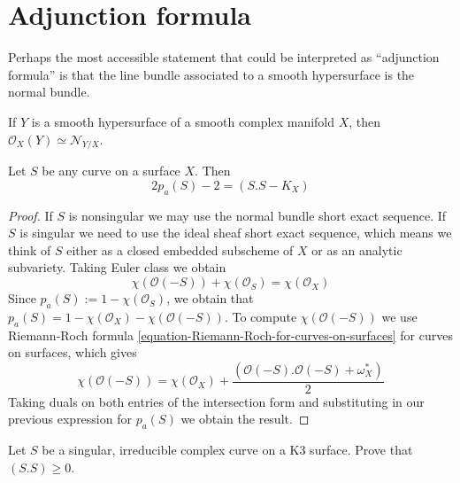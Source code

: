 \section{Adjunction formula}
\label{section-adjunction-formula}

Perhaps the most accessible statement that could be interpreted as ``adjunction
formula'' is that the line bundle associated to a smooth hypersurface is the
normal bundle.

\begin{theorem}
\label{theorem-adjunction-formula-1}
\begin{reference}
\cite[p.146]{gri}
\end{reference}
If $Y$ is a smooth hypersurface of a smooth complex manifold $X$, then
$\mathcal{O}_X(Y) \simeq \mathcal{N}_{Y/X}$.
\end{theorem}

\begin{lemma}
\label{lemma-adjunction-formula-for-curves-on-surfaces}
Let $S$ be any curve on a surface $X$. Then
\begin{equation}
\label{equation-adjunction-formula-for-curves-on-surfaces}
2p_a(S)-2=(S.S-K_X)
\end{equation}
\end{lemma}

\begin{proof}
If $S$ is nonsingular we may use the normal bundle short exact sequence. If
$S$ is singular we need to use the ideal sheaf short exact sequence, which means
we think of $S$ either as a closed embedded subscheme of $X$ or as an analytic 
subvariety. Taking Euler class we obtain
$$
\chi(\mathcal{O}(-S))+\chi(\mathcal{O}_S)=\chi(\mathcal{O}_X)
$$
Since $p_a(S):=1-\chi(\mathcal{O}_S)$, we obtain that
$p_a(S)=1-\chi(\mathcal{O}_X)-\chi(\mathcal{O}(-S))$. To compute
$\chi(\mathcal{O}(-S))$ we use Riemann-Roch formula
\ref{equation-Riemann-Roch-for-curves-on-surfaces} for curves on surfaces, which
gives
$$
\chi(\mathcal{O}(-S))=\chi(\mathcal{O}_X)
+\frac{(\mathcal{O}(-S).\mathcal{O}(-S)+\omega_X^*)}{2}
$$
Taking duals on both entries of the intersection form and substituting in our
previous expression for $p_a(S)$ we obtain the result.
\end{proof}

\begin{exercise}
\label{exercise-singular-curve-on-K3-has-positive-self-intersection}
Let $S$ be a singular, irreducible complex curve on a K3 surface. Prove that
$(S.S)\geq 0$.
\end{exercise}

